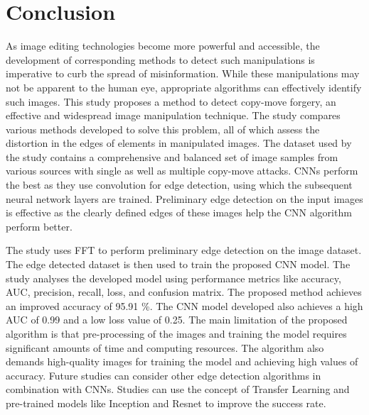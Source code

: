 \documentclass[conference]{IEEEtran}
\begin{document}
\section{Conclusion}
As image editing technologies become more powerful and accessible, the development of corresponding methods to detect such manipulations is imperative to curb the spread of misinformation. While these manipulations may not be apparent to the human eye, appropriate algorithms can effectively identify such images. This study proposes a method to detect copy-move forgery, an effective and widespread image manipulation technique. The study compares various methods developed to solve this problem, all of which assess the distortion in the edges of elements in manipulated images. The dataset used by the study contains a comprehensive and balanced set of image samples from various sources with single as well as multiple copy-move attacks. CNNs perform the best as they use convolution for edge detection, using which the subsequent neural network layers are trained. Preliminary edge detection on the input images is effective as the clearly defined edges of these images help the CNN algorithm perform better. 

The study uses FFT to perform preliminary edge detection on the image dataset. The edge detected dataset is then used to train the proposed CNN model. The study analyses the developed model using performance metrics like accuracy, AUC, precision, recall, loss, and confusion matrix. The proposed method achieves an improved accuracy of 95.91 \%. The CNN model developed also achieves a high AUC of 0.99 and a low loss value of 0.25. The main limitation of the proposed algorithm is that pre-processing of the images and training the model requires significant amounts of time and computing resources. The algorithm also demands high-quality images for training the model and achieving high values of accuracy. Future studies can consider other edge detection algorithms in combination with CNNs. Studies can use the concept of Transfer Learning and pre-trained models like Inception and Resnet to improve the success rate. 

\end{document}
